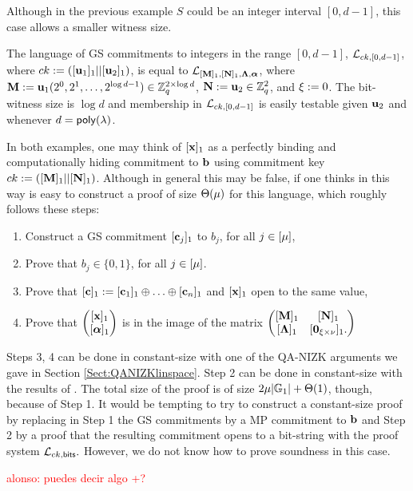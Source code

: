 Although in the previous example $S$ could be an integer interval $[0,d-1]$, this case allows a smaller witness size.

\begin{example}
The language of GS commitments to integers in the range $[0,d-1]$, $\mathcal{L}_{ck,[0,d-1]}$, where $ck:=([\mathbf{u}_1]_1||[\mathbf{u}_2]_1)$, is equal to $\mathcal{L}_{[\mathbf{{M}}]_1,[\mathbf{{N}}]_1,\mathbf{{\Lambda}},{\boldsymbol \alpha}}$, where
$\mathbf{{M}}:=\mathbf{u}_1(2^0,2^1,\ldots,2^{\log d-1})\in\mathbb{Z}_q^{2\times \log d}$, $\mathbf{{N}}:=\mathbf{u}_2\in\mathbb{Z}_q^{2}$, and ${\xi}:=0$. The bit-witness size is $\log d$ and membership in $\mathcal{L}_{ck,[0,d-1]}$ is easily testable given $\mathbf{u}_2$ and whenever $d=\mathsf{poly}(\lambda)$. 
\end{example}

In both examples, one may think of $[\mathbf{x}]_1$ as a perfectly binding and computationally hiding commitment to $\mathbf{b}$ using commitment key $ck:=([\mathbf{{M}}]_1||[\mathbf{{N}}]_1)$. Although in general this may be false, if one thinks in this way is easy to construct a proof of size $\Theta({\mu})$ for this language,  which roughly follows these steps:
\begin{enumerate}
\item Construct a GS commitment $[\mathbf{c}_j]_1$ to $b_j$, for all $j \in [{\mu}]$,
\item Prove that $b_j \in \{0,1\}$, for all $j \in [{\mu}]$.
\item Prove that $[\mathbf{c}]_1:=[\mathbf{c}_1]_1 \oplus \ldots \oplus [\mathbf{c}_n]_1$ and $[\mathbf{x}]_1$ open to the same value,
\item Prove that $\pmatri
{
    [\vecb{x}]_1\\
    [\grkb{\alpha}]_1
}$ is in the image of the matrix $
\begin{pmatrix}
    [\matr{M}]_1       & [\matr{N}]_1\\
    [\matr{\Lambda}]_1 & [\matr{0}_{\ld\times \lc}]_1.
    \end{pmatrix}$
\end{enumerate}

Steps 3, 4 can be done in constant-size with one of the QA-NIZK arguments we gave in Section \ref{Sect:QANIZKlinspace}. Step 2 can be done in constant-size with the results of \cite{AC:GonHevRaf15}. The total size of the proof is of size $2{\mu}|\mathbb{G}_1|+\Theta(1)$, though, because 
of Step 1. It would be tempting to try to construct a constant-size proof by replacing in Step 1 the GS commitments by a MP commitment to $\mathbf{b}$ and Step 2 by a proof that the resulting commitment opens to a bit-string with the proof system $\mathcal{L}_{ck,\mathsf{bits}}.$ However, we do not know how to prove soundness in this case. 

\textcolor{red}{alonso: puedes decir algo +?}
